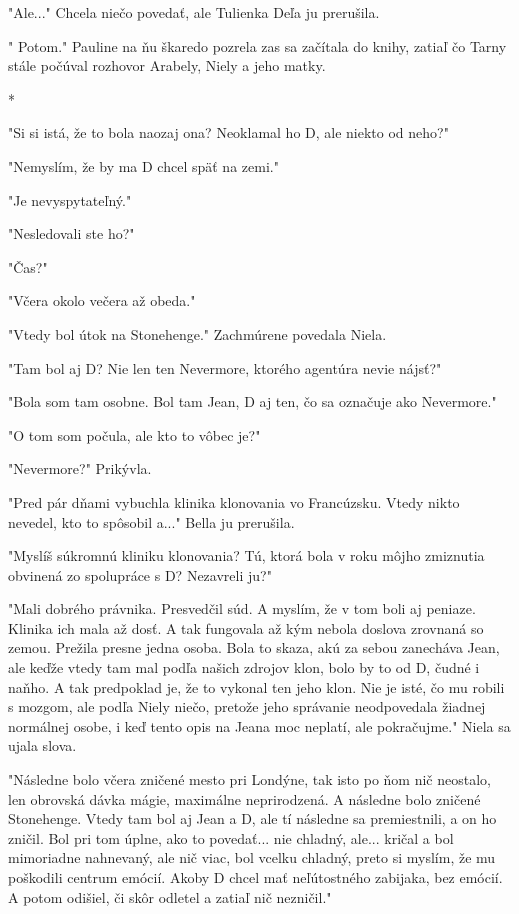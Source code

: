 \documentclass{book}
\begin{document}
"$ $Ale..."$ $  Chcela niečo povedať, ale Tulienka Deľa ju prerušila.

"$ $ Potom."$ $  Pauline na ňu škaredo pozrela zas sa začítala do knihy, zatiaľ čo Tarny stále počúval rozhovor Arabely, Niely a jeho matky.

\begin{center}

*

\end{center}

"$ $Si si istá, že to bola naozaj ona? Neoklamal ho D, ale niekto od neho?"$ $ 

"$ $Nemyslím, že by ma D chcel späť na zemi."$ $ 

"$ $Je nevyspytateľný."$ $ 

"$ $Nesledovali ste ho?"$ $ 

"$ $Čas?"$ $ 

"$ $Včera okolo večera až obeda."$ $ 

"$ $Vtedy bol útok na Stonehenge."$ $  Zachmúrene povedala Niela.

"$ $Tam bol aj D? Nie len ten Nevermore, ktorého agentúra nevie nájsť?"$ $ 

"$ $Bola som tam osobne. Bol tam Jean, D aj ten, čo sa označuje ako Nevermore."$ $ 

"$ $O tom som počula, ale kto to vôbec je?"$ $ 

"$ $Nevermore?"$ $  Prikývla.

"$ $Pred pár dňami vybuchla klinika klonovania vo Francúzsku. Vtedy nikto nevedel, kto to spôsobil a..."$ $  Bella ju prerušila.

"$ $Myslíš súkromnú kliniku klonovania? Tú, ktorá bola v roku môjho zmiznutia obvinená zo spolupráce s D? Nezavreli ju?"$ $ 

"$ $Mali dobrého právnika. Presvedčil súd. A myslím, že v tom boli aj peniaze. Klinika ich mala až dosť. A tak fungovala až kým nebola doslova zrovnaná so zemou. Prežila presne jedna osoba. Bola to skaza, akú za sebou zanecháva Jean, ale keďže vtedy tam mal podľa našich zdrojov klon, bolo by to od D, čudné i naňho. A tak predpoklad je, že to vykonal ten jeho klon. Nie je isté, čo mu robili s mozgom, ale podľa Niely niečo, pretože jeho správanie neodpovedala žiadnej normálnej osobe, i keď tento opis na Jeana moc neplatí, ale pokračujme."$ $  Niela sa ujala slova.

"$ $Následne bolo včera zničené mesto pri Londýne, tak isto po ňom nič neostalo, len obrovská dávka mágie, maximálne neprirodzená. A následne bolo zničené Stonehenge. Vtedy tam bol aj Jean a D, ale tí následne sa premiestnili, a on ho zničil. Bol pri tom úplne, ako to povedať... nie chladný, ale... kričal a bol mimoriadne nahnevaný, ale nič viac, bol vcelku chladný, preto si myslím, že mu poškodili centrum emócií. Akoby D chcel mať neľútostného zabijaka, bez emócií. A potom odišiel, či skôr odletel a zatiaľ nič nezničil."$ $ 
\end{document}
